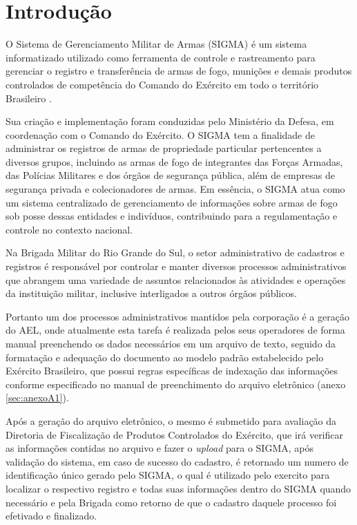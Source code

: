 \chapter{Introdução}

O Sistema de Gerenciamento Militar de Armas (SIGMA) é um sistema informatizado utilizado como ferramenta de controle e rastreamento para gerenciar o registro e transferência de armas de fogo, munições e demais produtos controlados de competência do Comando do Exército em todo o território Brasileiro 
\cite{ExércitoBrasileiro}.

Sua criação e implementação foram conduzidas pelo Ministério da Defesa, em coordenação com o Comando do Exército. O SIGMA tem a finalidade de administrar os registros de armas de propriedade particular pertencentes a diversos grupos, incluindo as armas de fogo de integrantes das Forças Armadas, das Polícias Militares e dos órgãos de segurança pública, além de empresas de segurança privada e colecionadores de armas. Em essência, o SIGMA atua como um sistema centralizado de gerenciamento de informações sobre armas de fogo sob posse dessas entidades e indivíduos, contribuindo para a regulamentação e controle no contexto nacional.
\cite{ExércitoBrasileiro}


Na Brigada Militar do Rio Grande do Sul, o setor administrativo de cadastros e registros é responsável por controlar e manter diversos processos administrativos que abrangem uma variedade de assuntos relacionados às atividades e operações da instituição militar, inclusive interligados a outros órgãos públicos. 
\cite{bmDepartamentoAdministrativo}

Portanto um dos processos administrativos mantidos pela corporação é a geração do AEL, onde atualmente esta tarefa é realizada pelos seus operadores de forma manual preenchendo os dados necessários em um arquivo de texto, seguido da formatação e adequação do documento ao modelo padrão estabelecido pelo Exército Brasileiro, que possui regras específicas de indexação das informações conforme especificado no manual de preenchimento do arquivo eletrônico (anexo \ref{sec:anexoA1}). 

Após a geração do arquivo eletrônico, o mesmo é submetido para avaliação da Diretoria de Fiscalização de Produtos Controlados do Exército, que irá verificar as informações contidas no arquivo e fazer o \textit{upload} para o SIGMA, após validação do sistema, em caso de sucesso do cadastro, é retornado um numero de identificação único gerado pelo SIGMA, o qual é utilizado pelo exercito para localizar o respectivo registro e todas suas informações dentro do SIGMA quando necessário e pela Brigada como retorno de que o cadastro daquele processo foi efetivado e finalizado.\cite{ExércitoBrasileiro}

